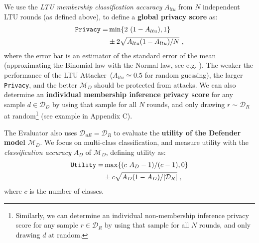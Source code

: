 \documentclass[letterpaper]{article}
\newcommand{\oracle}{LTU Attacker~}
\begin{document}
We use the {\em LTU membership classification accuracy} $A_{ltu}$ from $N$ independent LTU rounds (as defined above), to define a {\bf global privacy score} as:
\begin{align}\label{equation:privacy}
\texttt{Privacy} = &\min\{2~(1 - A_{ltu}), 1\} \notag \\
                   &\pm 2 \sqrt{A_{ltu}(1-A_{ltu})/N} ~,
\end{align}
where the error bar is an estimator of the standard error of the mean (approximating the Binomial law with the Normal law, see e.g. \cite{guyon-1998}).
The weaker the performance of the \oracle ($A_{ltu} \simeq 0.5$ for random guessing), the larger \texttt{Privacy}, and the better $\mathcal{M}_D$ should be protected from attacks.
We can also determine an {\bf individual membership inference privacy score} for any sample $d \in \mathcal{D}_{D}$ by using that sample for all $N$ rounds, and only drawing $r\sim \mathcal{D}_{R}$ at random\footnote{Similarly, we can determine an individual non-membership inference privacy score for any sample $r \in \mathcal{D}_{R}$ by using that sample for all $N$ rounds, and only drawing $d$ at random.} (see example in Appendix C).

The Evaluator also uses $\mathcal{D}_{uE} = \mathcal{D}_R$ to evaluate the {\bf utility of the Defender model} $\mathcal{M}_D$. We focus on multi-class classification, and measure utility with the {\em classification accuracy} $A_D$ of $\mathcal{M}_D$, defining utility as:
\begin{align}
    \texttt{Utility} = & \max\{(c~A_D - 1)/(c-1), 0\} \notag \\
    & \pm c \sqrt{A_D(1-A_D)/|\mathcal{D}_{R}|}~,
\label{equation:utility}
\end{align}
where $c$ is the number of classes.
\end{document}
